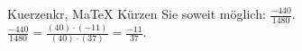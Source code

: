 \begin{MAufgabe}{Kuerzen}{kr, MaTeX}
K\"urzen Sie soweit m\"oglich: $\frac{-440}{1480}$.\\ 
\ifLsg\MLoesung
\quad $\frac{-440}{1480}=\frac{(40)\cdot(-11)}{(40)\cdot(37)}=\frac{-11}{37}$.\else\relax\fi
 \end{MAufgabe}